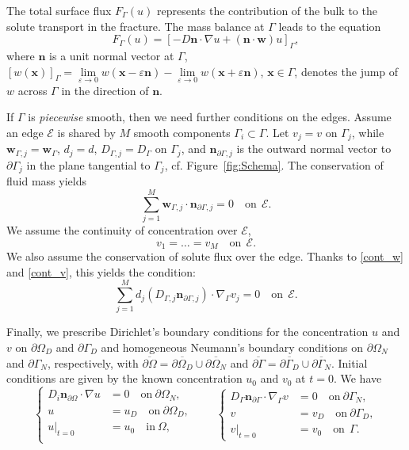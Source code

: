 \documentclass{article}
\let\eps\varepsilon
\newcommand{\bn}{\mathbf n}
\newcommand{\bw}{\mathbf w}
\newcommand{\bx}{\mathbf x}
\def\dO{{\partial\Omega} }
\def\dG{{\partial\Gamma} }
\begin{document}
The total surface flux $F_\Gamma(u)$ represents the contribution of the bulk to the solute transport in the fracture. The mass balance at  $\Gamma$ leads to the equation
\begin{equation}\label{Flux}
 F_\Gamma(u)= [-D \bn \cdot \nabla u + (\bn \cdot\bw)u]_\Gamma,
\end{equation}
where $\bn$ is a unit normal vector at $\Gamma$,
$[w(\bx)]_\Gamma = \lim\limits_{\eps\to0} w(\bx-\eps\bn)-\lim\limits_{\eps\to0} w(\bx+\eps\bn)$, $\bx\in\Gamma$,
denotes the jump of $w$ across $\Gamma$ in the direction of $\bn$.

If $\Gamma$ is  \textit{piecewise} smooth, then we need further conditions on the edges.
Assume an edge $\mathcal{E}$ is shared by  $M$  smooth components $\Gamma_i\subset\Gamma$.
Let $v_{j}=v$ on $\Gamma_j$, while $\bw_{\Gamma,j}=\bw_{\Gamma}$, $d_j=d$, $D_{\Gamma,j}=D_\Gamma$ on $\Gamma_j$, and $\bn_{\dG,j}$ is the outward  normal vector to $\dG_j$ in the plane tangential to $\Gamma_j$, cf. Figure~\ref{fig:Schema}.
The conservation of fluid mass yields
\begin{equation}\label{cont_w}
\sum_{j=1}^M\bw_{\Gamma,j}\cdot\bn_{\dG,j}=0\quad \text{on}~~\mathcal{E}.
\end{equation}
We assume the continuity of concentration over $\mathcal{E}$,
\begin{equation}\label{cont_v}
v_{1}=\dots=v_{M}\quad \text{on}~~\mathcal{E}.
\end{equation}
We also assume the conservation of solute flux over the edge. Thanks to \eqref{cont_w} and \eqref{cont_v}, this yields the condition:
\begin{equation}\label{cont_F}
\sum_{j=1}^M d_j(D_{\Gamma,j}\bn_{\dG,j})\cdot\nabla_\Gamma v_j=0\quad \text{on}~~\mathcal{E}.
\end{equation}

Finally, we prescribe Dirichlet's boundary conditions for the concentration $u$ and $v$ on $\dO_D$ and $\dG_D$ and homogeneous Neumann's boundary conditions on $\dO_N$ and $\dG_N$, respectively, with $\overline{\dO}=
\overline{\dO_D}\cup\overline{\dO_N}$ and $\overline{\dG}=\overline{\dG_D}\cup\overline{\dG_N}$. Initial conditions are given by the known concentration $u_0$ and $v_0$ at $t=0$. We have
\begin{equation} \label{bc}
\left\{
\begin{aligned}
 D_i \bn_\dO \cdot \nabla u&=0 \quad \text{on}~ \dO_N,\\
 u&=u_D \quad \text{on}~ \dO_D,\\
 u|_{t=0}&=u_0 \quad \text{in}~ \Omega,\\
 \end{aligned}
\right.\qquad \left\{
\begin{aligned}
D_{\Gamma}\bn_{\dG}\cdot\nabla_\Gamma v&=0 \quad \text{on}~ \dG_N,\\
 v&=v_D \quad \text{on}~ \dG_D,\\
 v|_{t=0}&=v_0 \quad \text{on}~~\Gamma.
 \end{aligned}
\right.
 \end{equation}
\end{document}
